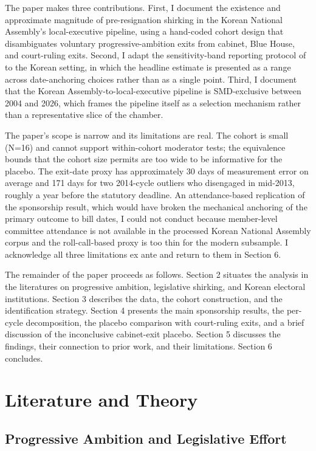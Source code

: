 \documentclass[11pt]{article}
\begin{document}
The paper makes three contributions. First, I document the existence and approximate magnitude of pre-resignation shirking in the Korean National Assembly's local-executive pipeline, using a hand-coded cohort design that disambiguates voluntary progressive-ambition exits from cabinet, Blue House, and court-ruling exits. Second, I adapt the sensitivity-band reporting protocol of \citet{titiunikfeher2017} to the Korean setting, in which the headline estimate is presented as a range across date-anchoring choices rather than as a single point. Third, I document that the Korean Assembly-to-local-executive pipeline is SMD-exclusive between 2004 and 2026, which frames the pipeline itself as a selection mechanism rather than a representative slice of the chamber.

The paper's scope is narrow and its limitations are real. The cohort is small (N=16) and cannot support within-cohort moderator tests; the equivalence bounds that the cohort size permits are too wide to be informative for the placebo. The exit-date proxy has approximately 30 days of measurement error on average and 171 days for two 2014-cycle outliers who disengaged in mid-2013, roughly a year before the statutory deadline. An attendance-based replication of the sponsorship result, which would have broken the mechanical anchoring of the primary outcome to bill dates, I could not conduct because member-level committee attendance is not available in the processed Korean National Assembly corpus and the roll-call-based proxy is too thin for the modern subsample. I acknowledge all three limitations ex ante and return to them in Section 6.

The remainder of the paper proceeds as follows. Section 2 situates the analysis in the literatures on progressive ambition, legislative shirking, and Korean electoral institutions. Section 3 describes the data, the cohort construction, and the identification strategy. Section 4 presents the main sponsorship results, the per-cycle decomposition, the placebo comparison with court-ruling exits, and a brief discussion of the inconclusive cabinet-exit placebo. Section 5 discusses the findings, their connection to prior work, and their limitations. Section 6 concludes.

\section{Literature and Theory}

\subsection{Progressive Ambition and Legislative Effort}
\end{document}
